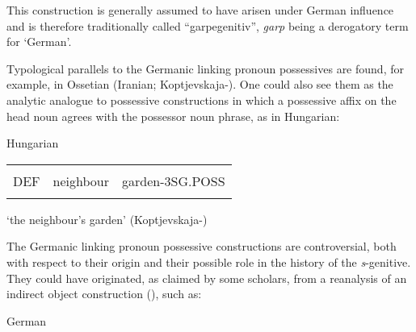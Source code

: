 \begin{styleBodyTextFirst}
This construction is generally assumed to have arisen under German influence and is therefore traditionally called “garpegenitiv”, \textit{garp} being a derogatory term for ‘German’.

\end{styleBodyTextFirst}

\begin{styleBodytextC}
Typological parallels to the Germanic linking pronoun possessives are found, for example, in Ossetian (Iranian; Koptjevskaja-\citet[669]{Tamm2003}). One could also see them as the analytic analogue to possessive constructions in which a possessive affix on the head noun agrees with the possessor noun phrase, as in Hungarian:

\end{styleBodytextC}

\begin{listWWNumileveli}
\item 

\begin{styleExample}
Hungarian

\end{styleExample}

\end{listWWNumileveli}

\begin{tabular}{lll}
\lsptoprule
\multicolumn{3}{l}{a

}\\
DEF & neighbour & garden-3SG.POSS\\
\lspbottomrule
\end{tabular}

\begin{styleTranslation}
‘the neighbour’s garden’ (Koptjevskaja-\citet[648]{Tamm2003}) 

\end{styleTranslation}

\begin{styleBodyTextFirst}
The Germanic linking pronoun possessive constructions are controversial, both with respect to their origin and their possible role in the history of the \textit{s}{}-genitive. They could have originated, as claimed by some scholars, from a reanalysis of an indirect object construction (\citet[638]{Behaghel1923}), such as:

\end{styleBodyTextFirst}

\begin{listWWNumileveli}
\item 

\begin{styleExample}
German

\end{styleExample}

\end{listWWNumileveli}

